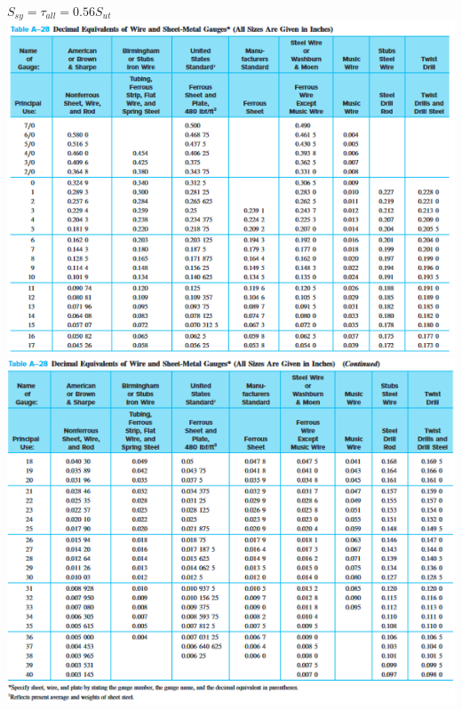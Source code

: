 \documentclass[11pt, fleqn]{article}
\begin{document}
$S_{sy} = \tau_{all} = 0.56S_{ut}$\\
\includegraphics[scale = 0.8]{Springs/TabA-28.1.png}\\
\includegraphics[scale = 0.8]{Springs/TabA-28.2.png}\\
\end{document}

